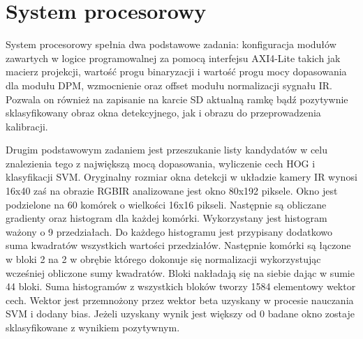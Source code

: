 \section{System procesorowy}

System procesorowy spełnia dwa podstawowe zadania: konfiguracja modułów zawartych w logice programowalnej za pomocą interfejsu AXI4-Lite takich jak macierz projekcji, wartość progu binaryzacji i wartość progu mocy dopasowania dla modułu DPM, wzmocnienie oraz offset modułu normalizacji sygnału IR. Pozwala on również na zapisanie na karcie SD aktualną ramkę bądź pozytywnie sklasyfikowany obraz okna detekcyjnego, jak i obrazu do przeprowadzenia kalibracji.

Drugim podstawowym zadaniem jest przeszukanie listy kandydatów w celu znalezienia tego z największą mocą dopasowania, wyliczenie cech HOG i klasyfikacji SVM. Oryginalny rozmiar okna detekcji w układzie kamery IR wynosi 16x40 zaś na obrazie RGBIR analizowane jest okno 80x192 piksele. Okno jest podzielone na 60 komórek o wielkości 16x16 pikseli. Następnie są obliczane gradienty oraz histogram dla każdej komórki. Wykorzystany jest histogram ważony o 9 przedziałach. Do każdego histogramu jest przypisany dodatkowo suma kwadratów wszystkich wartości przedziałów. Następnie komórki są łączone w bloki 2 na 2 w obrębie którego dokonuje się normalizacji wykorzystując wcześniej obliczone sumy kwadratów. Bloki nakładają się na siebie dając w sumie 44 bloki. Suma histogramów z wszystkich bloków tworzy 1584 elementowy wektor cech. Wektor jest przemnożony przez wektor beta uzyskany w procesie nauczania SVM i dodany bias. Jeżeli uzyskany wynik jest większy od 0 badane okno zostaje sklasyfikowane z wynikiem pozytywnym.

